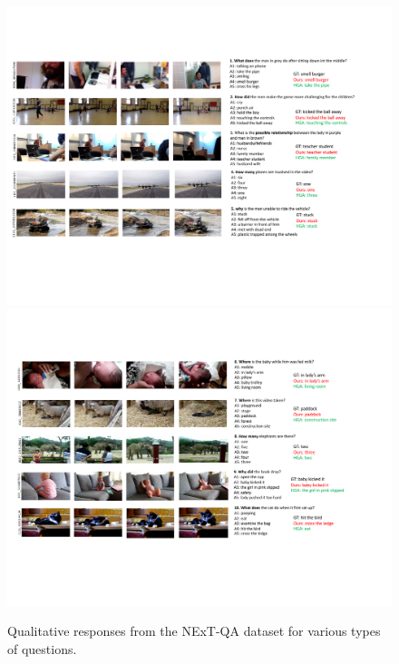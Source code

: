 \documentclass[letterpaper]{article} %
\begin{document}
\begin{figure}
    \centering
    \includegraphics[width=20cm,trim={0cm 5cm 1.5cm 3cm},clip]{./figs/quals_results_suppl.pdf}
    \includegraphics[width=20cm,trim={0.5cm 5cm 1.5cm 3cm},clip]{./figs/quals_results_suppl_2.pdf}
    \caption{Qualitative responses from the NExT-QA dataset for various types of questions.}
    \label{fig:next-qa-more-quals-x}
\end{figure}
\end{document}
